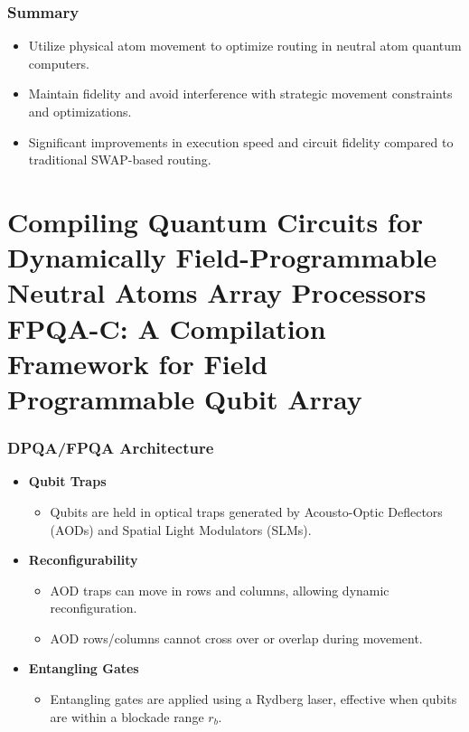 \documentclass[18 pt]{beamer}
\begin{document}
\begin{frame}
    \frametitle{Summary}
    \begin{itemize}
        \item Utilize physical atom movement to optimize routing in neutral atom quantum computers.
        \item Maintain fidelity and avoid interference with strategic movement constraints and optimizations.
        \item Significant improvements in execution speed and circuit fidelity compared to traditional SWAP-based routing.
    \end{itemize}
\end{frame}

\section{Compiling Quantum Circuits for Dynamically Field-Programmable Neutral Atoms Array Processors\\FPQA-C: A Compilation Framework for Field Programmable Qubit Array}
\begin{frame}
    \frametitle{DPQA/FPQA Architecture}
    \begin{itemize}
        \item \textbf{Qubit Traps}
        \begin{itemize}
            \item Qubits are held in optical traps generated by Acousto-Optic Deflectors (AODs) and Spatial Light Modulators (SLMs).
        \end{itemize}
        \item \textbf{Reconfigurability}
        \begin{itemize}
            \item AOD traps can move in rows and columns, allowing dynamic reconfiguration.
            \item AOD rows/columns cannot cross over or overlap during movement.
        \end{itemize}
        \item \textbf{Entangling Gates}
        \begin{itemize}
            \item Entangling gates are applied using a Rydberg laser, effective when qubits are within a blockade range \( r_b \).
        \end{itemize}
    \end{itemize}
\end{frame}
\end{document}
